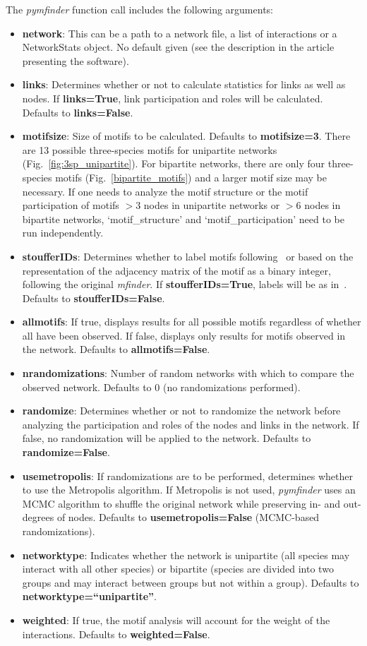 \documentclass[12pt]{article}
\begin{document}
			The \emph{pymfinder} function call includes the following arguments:
     	\begin{itemize}
     		\item \textbf{network}: This can be a path to a network file, a list of interactions or a NetworkStats object. No default given (see the description in the article presenting the software).
				\item \textbf{links}: Determines whether or not to calculate statistics for links as well as nodes. If \textbf{links=True}, link participation and roles will be calculated. Defaults to \textbf{links=False}.
				\item \textbf{motifsize}: Size of motifs to be calculated. Defaults to \textbf{motifsize=3}. There are 13 possible three-species motifs for unipartite networks (Fig.~\ref{fig:3sp_unipartite}). For bipartite networks, there are only four three-species motifs (Fig.~\ref{bipartite_motifs}) and a larger motif size may be necessary. If one needs to analyze the motif structure or the motif participation of motifs $>3$ nodes in unipartite networks or $>6$ nodes in bipartite networks, `motif\_structure' and `motif\_participation' need to be run independently.
				\item \textbf{stoufferIDs}: Determines whether to label motifs following~\citet{Stouffer2007} or based on the representation of the adjacency matrix of the motif as a binary integer, following the original \emph{mfinder}. If \textbf{stoufferIDs=True}, labels will be as in~\citet{Stouffer2007}. Defaults to \textbf{stoufferIDs=False}.
				\item \textbf{allmotifs}: If true, displays results for all possible motifs regardless of whether all have been observed. If false, displays only results for motifs observed in the network. Defaults to \textbf{allmotifs=False}.
				\item \textbf{nrandomizations}: Number of random networks with which to compare the observed network. Defaults to 0 (no randomizations performed).
				\item \textbf{randomize}: Determines whether or not to randomize the network before analyzing the participation and roles of the nodes and links in the network. If false, no randomization will be applied to the network. Defaults to \textbf{randomize=False}.
				\item \textbf{usemetropolis}: If randomizations are to be performed, determines whether to use the Metropolis algorithm. If Metropolis is not used, \emph{pymfinder} uses an MCMC algorithm to shuffle the original network while preserving in- and out-degrees of nodes. Defaults to \textbf{usemetropolis=False} (MCMC-based randomizations).
				\item \textbf{networktype}: Indicates whether the network is unipartite (all species may interact with all other species) or bipartite (species are divided into two groups and may interact between groups but not within a group). Defaults to \textbf{networktype=``unipartite''}.
				\item \textbf{weighted}: If true, the motif analysis will account for the weight of the interactions. Defaults to \textbf{weighted=False}.
			\end{itemize}
\end{document}
